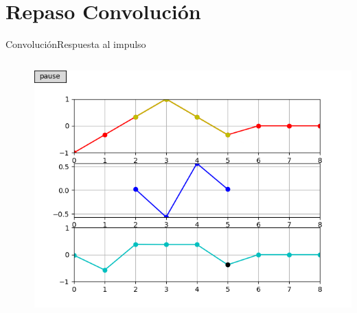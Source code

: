 \section{Repaso Convolución}
\begin{frame}{Convolución}{Respuesta al impulso}
   \begin{columns}[c]
      \hspace{5pt}
      \begin{column}{.3\textwidth}
         
      \end{column}
      \hspace{2pt}
      \vrule
      \hspace{2pt}
      \begin{column}{.3\textwidth}
         
      \end{column}
      \hspace{2pt}
      \vrule
      \hspace{2pt}
      \begin{column}{.38\textwidth}
         \centering\includegraphics[width=1.0\textwidth]{4_clase/conv1}
      \end{column}
      \hspace{2pt}
   \end{columns}
   \vfill
\end{frame}
